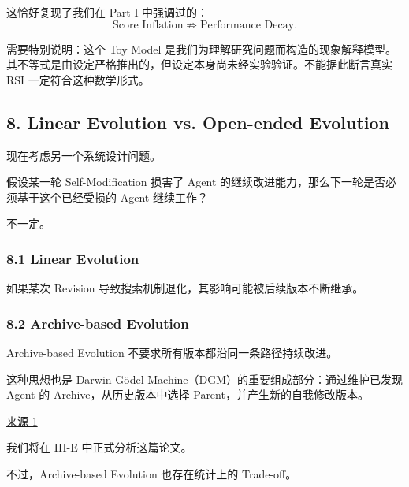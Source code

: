 这恰好复现了我们在 Part I 中强调过的：
\[\text{Score Inflation}
\not\Rightarrow
\text{Performance Decay}.\]

需要特别说明：这个 Toy Model 是我们为理解研究问题而构造的现象解释模型。其不等式是由设定严格推出的，但设定本身尚未经实验验证。不能据此断言真实 RSI 一定符合这种数学形式。

\hypertarget{part-3-37-0001-linear-evolution-vs.-open-ended-evolution}{%
\subsection{8. Linear Evolution vs. Open-ended Evolution}\label{part-3-37-0001-linear-evolution-vs.-open-ended-evolution}}

现在考虑另一个系统设计问题。

假设某一轮 Self-Modification 损害了 Agent 的继续改进能力，那么下一轮是否必须基于这个已经受损的 Agent 继续工作？

不一定。

\hypertarget{part-3-37-0001-linear-evolution}{%
\subsubsection{8.1 Linear Evolution}\label{part-3-37-0001-linear-evolution}}


如果某次 Revision 导致搜索机制退化，其影响可能被后续版本不断继承。

\hypertarget{part-3-37-0001-archive-based-evolution}{%
\subsubsection{8.2 Archive-based Evolution}\label{part-3-37-0001-archive-based-evolution}}


Archive-based Evolution 不要求所有版本都沿同一条路径持续改进。

这种思想也是 Darwin Gödel Machine（DGM）的重要组成部分：通过维护已发现 Agent 的 Archive，从历史版本中选择 Parent，并产生新的自我修改版本。

\href{https://arxiv.org/abs/2505.22954}{来源 1}

我们将在 III-E 中正式分析这篇论文。

不过，Archive-based Evolution 也存在统计上的 Trade-off。

